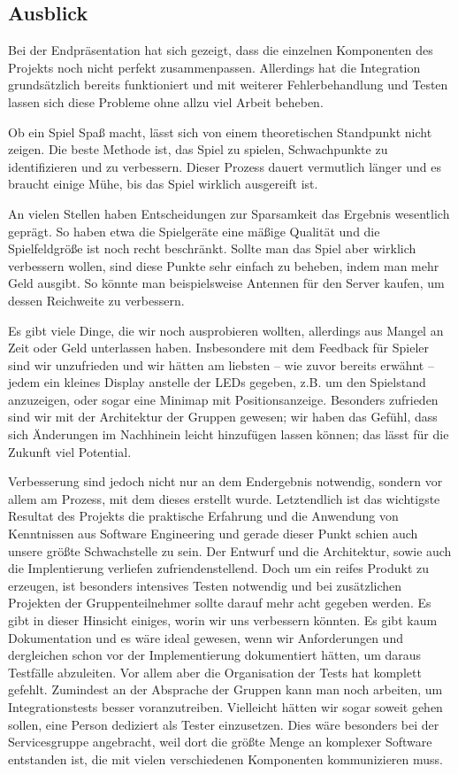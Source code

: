 \subsection{Ausblick}
\label{sec:ausblick}

Bei der Endpräsentation hat sich gezeigt, dass die einzelnen Komponenten des
Projekts noch nicht perfekt zusammenpassen. Allerdings hat die Integration
grundsätzlich bereits funktioniert und mit weiterer Fehlerbehandlung und
Testen lassen sich diese Probleme ohne allzu viel Arbeit beheben.

Ob ein Spiel Spaß macht, lässt sich von einem theoretischen Standpunkt nicht
zeigen. Die beste Methode ist, das Spiel zu spielen, Schwachpunkte zu
identifizieren und zu verbessern. Dieser Prozess dauert vermutlich länger und
es braucht einige Mühe, bis das Spiel wirklich ausgereift ist.

An vielen Stellen haben Entscheidungen zur Sparsamkeit das Ergebnis wesentlich
geprägt. So haben etwa die Spielgeräte eine mäßige Qualität und die
Spielfeldgröße ist noch recht beschränkt. Sollte man das Spiel aber wirklich
verbessern wollen, sind diese Punkte sehr einfach zu beheben, indem man
mehr Geld ausgibt. So könnte man beispielsweise Antennen für den Server kaufen,
um dessen Reichweite zu verbessern.

Es gibt viele Dinge, die wir noch ausprobieren wollten, allerdings aus
Mangel an Zeit oder Geld unterlassen haben. Insbesondere mit dem Feedback für
Spieler sind wir unzufrieden und wir hätten am liebsten – wie zuvor bereits
erwähnt – jedem ein kleines Display anstelle der LEDs gegeben, z.B. um den
Spielstand anzuzeigen, oder sogar eine Minimap mit Positionsanzeige.
Besonders zufrieden sind wir mit der Architektur der Gruppen gewesen; wir haben
das Gefühl, dass sich Änderungen im Nachhinein leicht hinzufügen lassen können;
das lässt für die Zukunft viel Potential.

Verbesserung sind jedoch nicht nur an dem Endergebnis notwendig, sondern vor
allem am Prozess, mit dem dieses erstellt wurde. Letztendlich ist das wichtigste
Resultat des Projekts die praktische Erfahrung und die Anwendung von Kenntnissen
aus Software Engineering und gerade dieser Punkt schien auch unsere größte
Schwachstelle zu sein. Der Entwurf und die Architektur, sowie auch die
Implentierung verliefen zufriendenstellend. Doch um ein reifes Produkt zu
erzeugen, ist besonders intensives Testen notwendig und bei zusätzlichen
Projekten der Gruppenteilnehmer sollte darauf mehr acht gegeben werden. Es gibt
in dieser Hinsicht einiges, worin wir uns verbessern könnten. Es gibt kaum
Dokumentation und es wäre ideal gewesen, wenn wir Anforderungen und dergleichen
schon vor der Implementierung dokumentiert hätten, um daraus Testfälle
abzuleiten. Vor allem aber die Organisation der Tests hat komplett gefehlt.
Zumindest an der Absprache der Gruppen kann man noch arbeiten, um
Integrationstests besser voranzutreiben. Vielleicht hätten wir sogar soweit
gehen sollen, eine Person dediziert als Tester einzusetzen. Dies wäre
besonders bei der Servicesgruppe angebracht, weil dort die größte Menge an
komplexer Software entstanden ist, die mit vielen verschiedenen Komponenten
kommunizieren muss.

